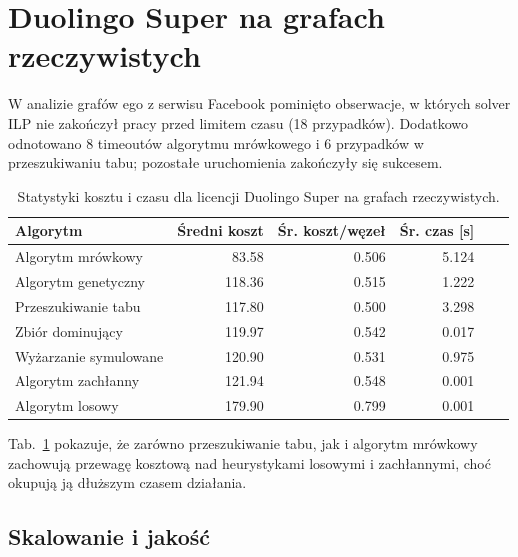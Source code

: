 \section{Duolingo Super na grafach rzeczywistych}

W analizie grafów ego z serwisu Facebook pominięto obserwacje, w których solver ILP nie zakończył pracy przed limitem czasu (18 przypadków). Dodatkowo odnotowano 8 timeoutów algorytmu mrówkowego i 6 przypadków w przeszukiwaniu tabu; pozostałe uruchomienia zakończyły się sukcesem.

\begin{table}[H]
  \centering
  \caption{Statystyki kosztu i czasu dla licencji Duolingo Super na grafach rzeczywistych.}
  \label{tab:duo-real-alg}
  \begin{tabular}{lrrrrr}
    \toprule
    \textbf{Algorytm}     & \textbf{Średni koszt} & \textbf{Śr. koszt/węzeł} & \textbf{Śr. czas [s]} \\
    \midrule
    Algorytm mrówkowy     & 83.58                 & 0.506                    & 5.124                 \\
    Algorytm genetyczny   & 118.36                & 0.515                    & 1.222                 \\
    Przeszukiwanie tabu   & 117.80                & 0.500                    & 3.298                 \\
    Zbiór dominujący      & 119.97                & 0.542                    & 0.017                 \\
    Wyżarzanie symulowane & 120.90                & 0.531                    & 0.975                 \\
    Algorytm zachłanny    & 121.94                & 0.548                    & 0.001                 \\
    Algorytm losowy       & 179.90                & 0.799                    & 0.001                 \\
    \bottomrule
  \end{tabular}
\end{table}
Tab.~\ref{tab:duo-real-alg} pokazuje, że zarówno przeszukiwanie tabu, jak i algorytm mrówkowy zachowują przewagę kosztową nad heurystykami losowymi i zachłannymi, choć okupują ją dłuższym czasem działania.

\subsection{Skalowanie i jakość}

